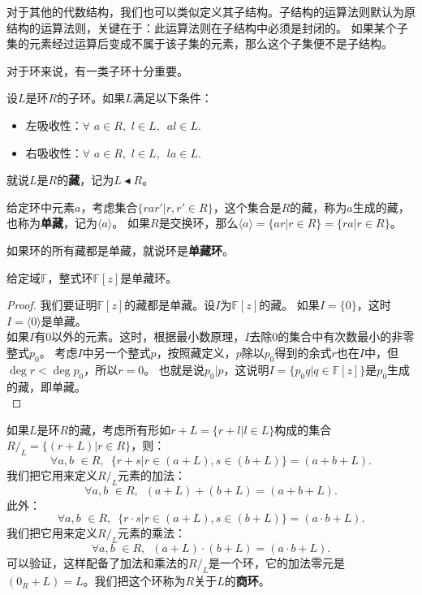\documentclass[12pt,UTF8,fontset=none]{ctexbook}
\begin{document}
\begin{appendix}
对于其他的代数结构，我们也可以类似定义其子结构。子结构的运算法则默认为原结构的运算法则，关键在于：此运算法则在子结构中必须是封闭的。
如果某个子集的元素经过运算后变成不属于该子集的元素，那么这个子集便不是子结构。

对于环来说，有一类子环十分重要。
\begin{df}\label{df:0_3_4}
    设$L$是环$R$的子环。如果$L$满足以下条件：
    \begin{itemize}
        \item 左吸收性：$\forall \,\, a \in R,\,\, l \in L, \,\,\, al \in L.$
        \item 右吸收性：$\forall\,\, a \in R,\,\, l \in L, \,\,\, la \in L.$
    \end{itemize}
    就说$L$是$R$的\textbf{藏}，记为$L \blacktriangleleft R$。
\end{df}

给定环中元素$a$，考虑集合$\{rar' | r, r' \in R\}$，这个集合是$R$的藏，称为$a$生成的藏，也称为\textbf{单藏}，记为$\langle a \rangle$。
如果$R$是交换环，那么$\langle a \rangle = \{ar | r \in R\}= \{ra | r \in R\}$。

如果环的所有藏都是单藏，就说环是\textbf{单藏环}。

\begin{pp}\label{pp:0_3_5}
    给定域$\mathbb{F}$，整式环$\mathbb{F}[z]$是单藏环。
\end{pp}
\begin{proof} %
    我们要证明$\mathbb{F}[z]$的藏都是单藏。设$I$为$\mathbb{F}[z]$的藏。
    如果$I = \{0\}$，这时$I = \langle 0 \rangle$是单藏。\\
    如果$I$有$0$以外的元素。这时，根据最小数原理，$I$去除$0$的集合中有次数最小的非零整式$p_0$。
    考虑$I$中另一个整式$p$，按照藏定义，$p$除以$p_0$得到的余式$r$也在$I$中，但$\deg r < \deg p_0$，所以$r = 0$。
    也就是说$p_0 | p$，这说明$I = \{p_0q | q \in \mathbb{F}[z]\}$是$p_0$生成的藏，即单藏。\\
\end{proof}

如果$L$是环$R$的藏，考虑所有形如$r + L = \{r + l|l\in L\}$构成的集合$R/_L = \{(r+L) | r \in R \}$，则：
$$ \forall a, b \,\, \in R, \,\,\, \{r + s | r \in (a + L), s \in (b + L)\} = (a + b + L).$$
我们把它用来定义$R/_L$元素的加法：
$$ \forall a, b \,\, \in R, \,\,\, (a + L) + (b + L)= (a + b + L).$$
此外：
$$ \forall a, b \,\, \in R, \,\,\, \{r \cdot s | r \in (a + L), s \in (b + L)\} = (a \cdot b + L).$$
我们把它用来定义$R/_L$元素的乘法：
$$ \forall a, b \,\, \in R, \,\,\, (a + L) \cdot (b + L)= (a \cdot b + L).$$
可以验证，这样配备了加法和乘法的$R/_L$是一个环，它的加法零元是$(0_R + L) = L$。我们把这个环称为$R$关于$L$的\textbf{商环}。


\end{appendix}
\end{document}
